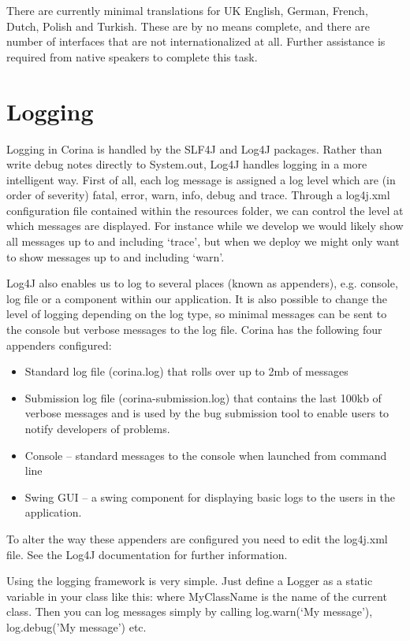 There are currently minimal translations for UK English, German, French, Dutch, Polish and Turkish.  These are by no means complete, and there are number of interfaces that are not internationalized at all.  Further assistance is required from native speakers to complete this task.

\section{Logging}
Logging in Corina is handled by the SLF4J and Log4J packages.  Rather than write debug notes directly to System.out, Log4J handles logging in a more intelligent way.  First of all, each log message is assigned a log level which are (in order of severity) fatal, error, warn, info, debug and trace.  Through a log4j.xml configuration file contained within the resources folder, we can control the level at which messages are displayed.  For instance while we develop we would likely show all messages up to and including `trace', but when we deploy we might only want to show messages up to and including `warn'. 

Log4J also enables us to log to several places (known as appenders), e.g. console, log file or a component within our application.  It is also possible to change the level of logging depending on the log type, so minimal messages can be sent to the console but verbose messages to the log file.  Corina has the following four appenders configured:

\begin{itemize}
 \item Standard log file (corina.log) that rolls over up to 2mb of messages
 \item Submission log file (corina-submission.log) that contains the last 100kb of verbose messages and is used by the bug submission tool to enable users to notify developers of problems.
 \item Console -- standard messages to the console when launched from command line
 \item Swing GUI -- a swing component for displaying basic logs to the users in the application.
\end{itemize}

To alter the way these appenders are configured you need to edit the log4j.xml file.  See the Log4J documentation for further information.

Using the logging framework is very simple.  Just define a Logger as a static variable in your class like this:
where MyClassName is the name of the current class.  Then you can log messages simply by calling log.warn(`My message'), log.debug('My message') etc.

